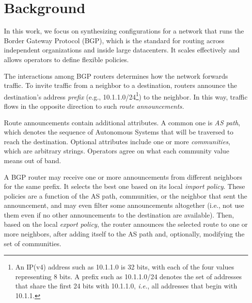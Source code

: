 \documentclass[numbers, 10pt, preprint]{sigplanconf}
\newcommand{\IE}{\emph{i.e.}}
\begin{document}

%
%
%
%

\section{Background}
\label{sec:background}

In this work, we focus on synthesizing configurations for a network that runs the Border Gateway Protocol (BGP), which is the standard for routing across independent organizations and inside large datacenters. It scales effectively and allows operators to define flexible policies.

The interactions among BGP routers determines how the network forwards traffic. To invite traffic from a neighbor to a destination, routers announce the destination's address {\em prefix} (e.g., 10.1.1.0/24\footnote{An IP(v4) address
such as 10.1.1.0 is 32 bits, with each of the four values representing 8 bits. A prefix such as 10.1.1.0/24 denotes the set of addresses that share the first 24 bits with 10.1.1.0, \IE, all addresses that begin with 10.1.1.}) to the neighbor. In this way, traffic flows in the opposite direction to such {\em route announcements.}

Route announcements contain additional attributes. A common one is {\em AS path}, which denotes the sequence of Autonomous Systems that will be traversed to reach the destination. 
Optional attributes include one or more {\em communities}, which are arbitrary strings. Operators agree on what each community value means out of band.

A BGP router may receive one or more announcements from different neighbors for the same prefix. It selects the best one based on its local {\em import policy}. These policies are a function of the AS path, communities, or the neighbor that sent the announcement, and may even filter some announcements altogether (i.e., not use them even if no other announcements to the destination are available). Then, based on the local {\em export policy}, the router announces the selected route to one or more neighbors, after adding itself to the AS path and, optionally, modifying the set of communities.
\end{document}
